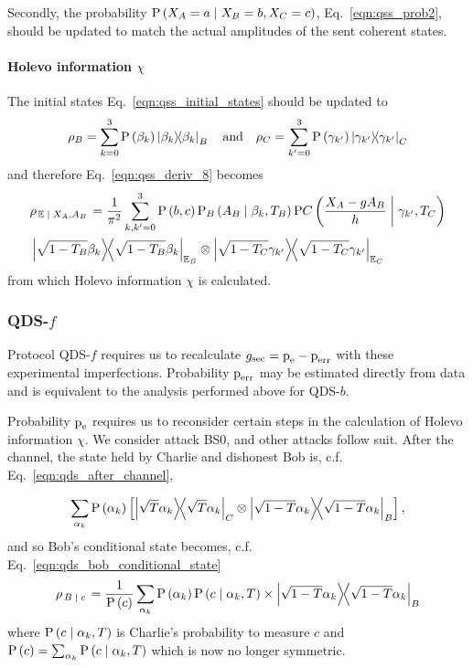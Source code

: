 Secondly, the probability $\text{P}\left(X_A=a \; \middle| \; X_B=b, X_C=c\right)$, Eq.~\ref{eqn:qss_prob2}, should be updated to match the actual amplitudes of the sent coherent states.

\paragraph{Holevo information $\chi$}
The initial states Eq.~\ref{eqn:qss_initial_states} should be updated to
\begin{equation}
\rho_B = \sum_{k=0}^3 \text{P}\left(\beta_k\right) \dyad{\beta_k}_B \qq{and} \rho_C = \sum_{k^\prime=0}^3 \text{P}\left(\gamma_{k^\prime}\right) \dyad{\gamma_{k^\prime}}_C
\end{equation}
and therefore Eq.~\ref{eqn:qss_deriv_8} becomes
\begin{align}
&\rho_{\left.\mathbb{E} \given X_A, A_B\right.} = \frac{1}{\pi^2}\sum_{k, k^\prime=0}^3 \text{P}\left(b, c\right) \text{P}_B\left(A_B \given \beta_k, T_B\right) \text{P}C\left(\frac{X_A - g A_B}{h} \given \gamma_{k^\prime}, T_C\right) \notag \\
&\dyad{\sqrt{1-T_B}\beta_k}_{\mathbb{E}_B} \otimes \dyad{\sqrt{1-T_C} \gamma_{k^\prime}}_{\mathbb{E}_C}
\end{align}
from which Holevo information $\chi$ is calculated.

\subsubsection{QDS-$f$}
Protocol QDS-$f$ requires us to recalculate $g_{\text{sec}} = \text{p}_{\text{e}} - \text{p}_{\text{err}}$ with these experimental imperfections. Probability $\text{p}_{\text{err}}$ may be estimated directly from data and is equivalent to the analysis performed above for QDS-$b$.

Probability $\text{p}_{\text{e}}$ requires us to reconsider certain steps in the calculation of Holevo information $\chi$. We consider attack BS$0$, and other attacks follow suit. After the channel, the state held by Charlie and dishonest Bob is, c.f. Eq.~\ref{eqn:qds_after_channel},

\begin{equation}
\sum_{\alpha_k} \text{P}\left(\alpha_k\right)  \left[ \dyad{\sqrt{T}\alpha_k}_C \otimes \dyad{\sqrt{1-T}\alpha_k}_B\right],
\end{equation}
and so Bob's conditional state becomes, c.f. Eq.~\ref{eqn:qds_bob_conditional_state}
\begin{equation}
\rho_{\left.B \given c\right.} = \frac{1}{\text{P}\left(c\right)} \sum_{\alpha_k} \text{P}\left(\alpha_k\right) \text{P}\left(c \given \alpha_k, T\right) \times \dyad{\sqrt{1-T}\alpha_k}_B
\end{equation}
where $\text{P}\left(c \; \middle| \; \alpha_k, T\right)$ is Charlie's probability to measure $c$ and $\text{P}\left(c\right) = \sum_{\alpha_k}\text{P}\left(c \; \middle| \; \alpha_k, T\right)$ which is now no longer symmetric.

